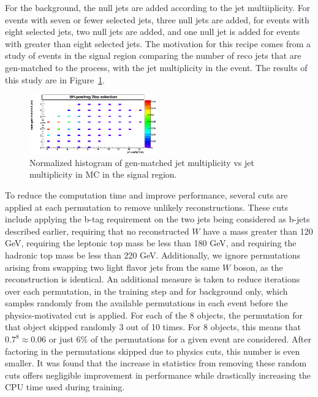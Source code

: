 For the background, the null jets are added according to the
jet multiiplicity. For events with seven or fewer selected jets, three null jets are
added, for events with eight selected jets, two null jets are added, and one null jet
is added for events with greater than eight selected jets. The motivation for this recipe
comes from a study of \tth events in the signal region comparing the number of reco jets that are
gen-matched to the \tth process, with the jet multiplicity in the event. The results of this study are
in Figure~\ref{fig:jet_matching}. 

\begin{figure}[htp]
\centering
\includegraphics[width=0.49\textwidth]{ch8_figs/jet_matching.png}
\caption[Comparison of gen-matched jet multiplicity to jet multiplicity in signal events]{ Normalized histogram of gen-matched jet multiplicity vs jet multiplicity in \tth MC in the signal region.}
\label{fig:jet_matching}
\end{figure}

To reduce the computation time and improve performance,
several cuts are applied at each permutation to remove unlikely reconstructions.
These cuts include applying the b-tag requirement on the two jets being considered
as b-jets described earlier, requiring that no
reconstructed $W$ have a mass greater than 120 GeV, requiring the leptonic top mass
be less than 180 GeV, and requiring 
the hadronic top mass be less than 220 GeV. Additionally, we ignore permutations
arising from swapping two light flavor jets from the same $W$ boson, as the reconstruction is
identical.
An additional measure is taken to reduce iterations over each permutation, in the training step and for background only,
which samples randomly from the available permutations in each event before the physics-motivated cut is applied.
For each of the 8 objects, the permutation for that object skipped randomly 3 out of 10 times. For 8 objects,
this means that $0.7^{8} \approx 0.06$ or just 6$\%$ of the permutations for a given event are considered. After factoring
in the permutations skipped due to physics cuts, this number is even smaller. It was found that the increase in statistics
from removing these random cuts offers negligible improvement in performance while drastically increasing the CPU time used
during training.

